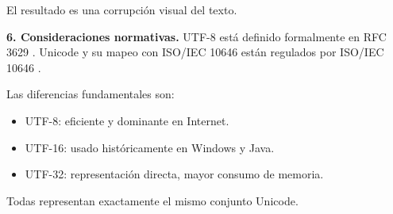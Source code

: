 \documentclass[12pt,twoside]{book}
\begin{document}
				El resultado es una corrupción visual del texto.
				
				\noindent
				\textbf{6. Consideraciones normativas.} UTF-8 está definido formalmente en RFC 3629 \cite{Yergeau2003UTF8}.  
				Unicode y su mapeo con ISO/IEC 10646 están regulados por ISO/IEC 10646 \cite{ISOIEC2020Information}.  
				
				Las diferencias fundamentales son:
				
				\begin{itemize}
					\item UTF-8: eficiente y dominante en Internet.
					\item UTF-16: usado históricamente en Windows y Java.
					\item UTF-32: representación directa, mayor consumo de memoria.
				\end{itemize}
				
				Todas representan exactamente el mismo conjunto Unicode.
			
		\backmatter
		\printbibliography		
	
\end{document}
